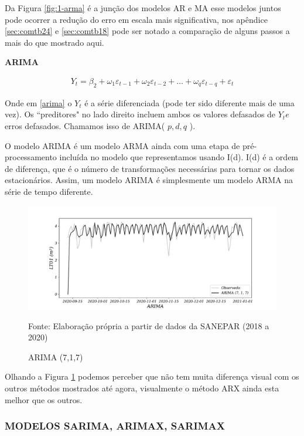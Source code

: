 Da Figura \ref{fig:1-arma} é a junção dos modelos AR e MA esse modelos juntos pode ocorrer a redução do erro em escala mais significativa, nos apêndice \ref{sec:comtb24} e \ref{sec:comtb18} pode ser notado a comparação de alguns passos a mais do que mostrado aqui.

\textbf{ARIMA}

\begin{eqnarray}
	Y_t = \beta_2 + \omega_1\varepsilon_{t-1} + \omega_2 \varepsilon_{t-2} +\ldots+ \omega_q \varepsilon_{t-q} + \varepsilon_t \label{arima}
\end{eqnarray}


Onde em \eqref{arima} o $Y_t$ é a série diferenciada (pode ter sido diferente mais de uma vez). Os ``preditores" no lado direito incluem ambos os valores defasados de $Y_t e$ erros defasados. Chamamos isso de ARIMA( $p, d, q$ ).

O modelo ARIMA é um modelo ARMA ainda com uma etapa de pré-processamento incluída no modelo que representamos usando I(d). I(d) é a ordem de diferença, que é o número de transformações necessárias para tornar os dados estacionários. Assim, um modelo ARIMA é simplesmente um modelo ARMA na série de tempo diferente.

\begin{figure}[H]
	\centering
	\caption{ARIMA (7,1,7)  }
	\label{fig:1-arima}
	\includegraphics[width=1\linewidth]{Modelos/Figuras/1-ARIMA}
	
	Fonte: Elaboração própria a partir de dados da SANEPAR (2018 a 2020)
\end{figure}

Olhando a Figura \ref{fig:1-arima} podemos perceber que não tem muita diferença visual com os outros métodos mostrados até agora, visualmente o método ARX ainda esta melhor que os outros.  


\subsubsection{MODELOS SARIMA, ARIMAX, SARIMAX}

